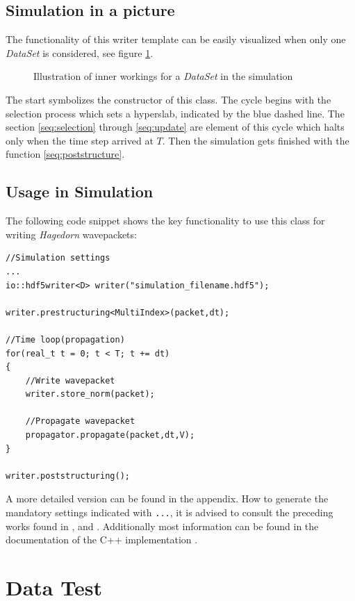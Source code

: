 \section{Simulation in a picture}
The functionality of this writer template can be easily visualized when only one \textit{DataSet} is considered, see figure \ref{fig:illustration}.
\begin{figure}[ht!]
\caption{Illustration of inner workings for a \textit{DataSet} in the simulation}
\label{fig:illustration}
\end{figure}
The start symbolizes the constructor of this class. The cycle begins with the selection process which sets a hyperslab, indicated by the blue dashed line. The section \ref{seq:selection} through \ref{seq:update} are element of this cycle which halts only when the time step arrived at $T$. Then the simulation gets finished with the function \ref{seq:poststructure}.

\section{Usage in Simulation}
The following code snippet shows the key functionality to use this class for writing \textit{Hagedorn} wavepackets:

\begin{lstlisting}
//Simulation settings
...
io::hdf5writer<D> writer("simulation_filename.hdf5");

writer.prestructuring<MultiIndex>(packet,dt);

//Time loop(propagation)
for(real_t t = 0; t < T; t += dt)
{
	//Write wavepacket
	writer.store_norm(packet);
	
	//Propagate wavepacket
   	propagator.propagate(packet,dt,V);
}

writer.poststructuring();
\end{lstlisting}
A more detailed version can be found in the appendix. How to generate the mandatory settings indicated with \texttt{...}, it is advised to consult the preceding works found in \cite{bt_michajab}, \cite{st_benedekv} and \cite{bt_lionelm}. Additionally most information can be found in the documentation of the C++ implementation \cite{libwaveblocks}.

\chapter{Data Test}
\label{chapt:datatest}

